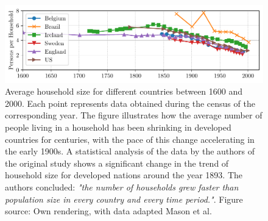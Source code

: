 \documentclass{article}
\begin{document}
\begin{figure}[ht!]
    \includegraphics[width=\textwidth]{./figures/household_size.pdf}
    \vspace{-5mm}
    \caption{
        Average household size for different countries between 1600 and 2000. Each point represents data obtained during the census of the corresponding year. The figure illustrates how the average number of people living in a household has been shrinking in developed countries for centuries, with the pace of this change accelerating in the early 1900s. A statistical analysis of the data by the authors of the original study shows 
        a significant change in the trend of household size for developed nations around the year 1893. The authors concluded: \textit{"the number of households grew faster than population size in every country and every time period."}. Figure source: Own rendering, with data adapted Mason et al. \cite[Figure 2]{bradbury_long-term_2014}
    }
    \label{fig:households}
\end{figure}
\end{document}
